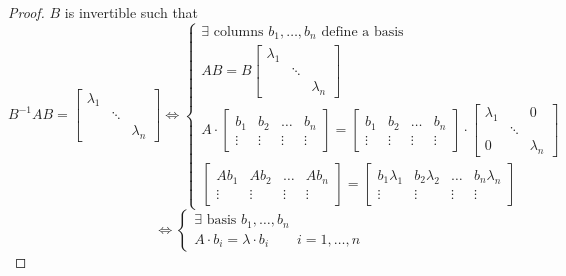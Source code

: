 \documentclass[a4paper]{article}
\numberwithin{lecref}{section}
\begin{document}
\begin{proof}
  $B$ is invertible such that
  \[
    B^{-1} AB = \begin{bmatrix} \lambda_1 & & \\ & \ddots & \\ & & \lambda_n \end{bmatrix}
    \iff \begin{cases}
      \exists \text{ columns } b_{1}, \dots, b_n \text{ define a basis} \\
      AB = B \begin{bmatrix} \lambda_1 & & \\ & \ddots & \\ & & \lambda_n \end{bmatrix} \\
      A \cdot \begin{bmatrix} b_1 & b_2 & \dots & b_n \\ \vdots & \vdots & \vdots & \vdots \end{bmatrix} = \begin{bmatrix} b_1 & b_2 & \dots & b_n \\ \vdots & \vdots & \vdots & \vdots \end{bmatrix} \cdot \begin{bmatrix} \lambda_1 &  & 0 \\ & \ddots & \\ 0 & & \lambda_n \end{bmatrix} \\
      \begin{bmatrix} Ab_1 & Ab_2 & \dots & Ab_n \\ \vdots & \vdots & \vdots & \vdots \end{bmatrix} = \begin{bmatrix} b_1 \lambda_1 & b_2 \lambda_2 & \dots & b_n \lambda_n \\ \vdots & \vdots & \vdots & \vdots \end{bmatrix}
    \end{cases}
  \] \[
    \iff \begin{cases}
      \exists \text{ basis } b_1, \dots, b_n \\
      A \cdot b_i = \lambda \cdot b_i \qquad i = 1, \dots, n
    \end{cases}
  \]
\end{proof}
\end{document}
